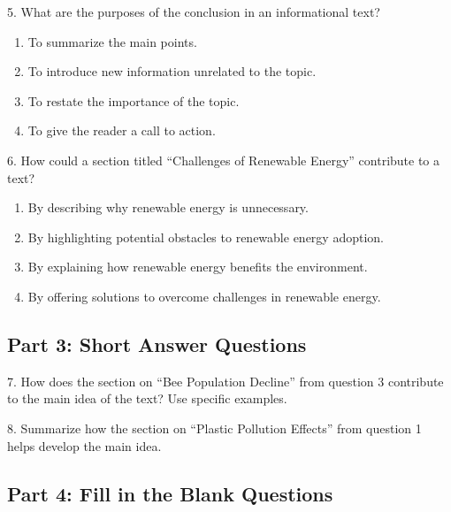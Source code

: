 \documentclass[12pt]{article}
\begin{document}
\vspace{1cm}

5. What are the purposes of the conclusion in an informational text?\\
\begin{enumerate}[label=\Alph*.]
    \item To summarize the main points.  
    \item To introduce new information unrelated to the topic.  
    \item To restate the importance of the topic.  
    \item To give the reader a call to action.  
\end{enumerate}

\vspace{1cm}

6. How could a section titled “Challenges of Renewable Energy” contribute to a text?\\
\begin{enumerate}[label=\Alph*.]
    \item By describing why renewable energy is unnecessary.  
    \item By highlighting potential obstacles to renewable energy adoption.  
    \item By explaining how renewable energy benefits the environment.  
    \item By offering solutions to overcome challenges in renewable energy.  
\end{enumerate}


\newpage
\subsection*{Part 3: Short Answer Questions}

7. How does the section on “Bee Population Decline” from question 3 contribute to the main idea of the text? Use specific examples.\\
\vspace{4cm}

8. Summarize how the section on “Plastic Pollution Effects” from question 1 helps develop the main idea.\\
\vspace{4cm}

\subsection*{Part 4: Fill in the Blank Questions}
\end{document}
